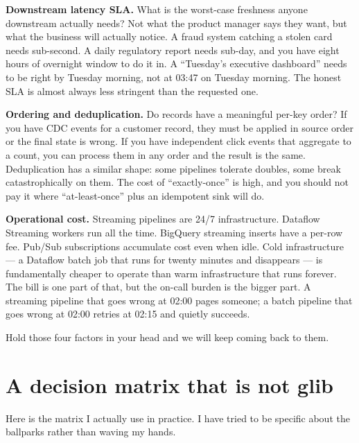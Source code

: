 \documentclass[
  11pt,
  british,
  oneside]{book}
\begin{document}
\textbf{Downstream latency SLA.} What is the worst-case freshness anyone
downstream actually needs? Not what the product manager says they want,
but what the business will actually notice. A fraud system catching a
stolen card needs sub-second. A daily regulatory report needs sub-day,
and you have eight hours of overnight window to do it in. A ``Tuesday's
executive dashboard'' needs to be right by Tuesday morning, not at 03:47
on Tuesday morning. The honest SLA is almost always less stringent than
the requested one.

\textbf{Ordering and deduplication.} Do records have a meaningful
per-key order? If you have CDC events for a customer record, they must
be applied in source order or the final state is wrong. If you have
independent click events that aggregate to a count, you can process them
in any order and the result is the same. Deduplication has a similar
shape: some pipelines tolerate doubles, some break catastrophically on
them. The cost of ``exactly-once'' is high, and you
should not pay it where ``at-least-once'' plus an idempotent sink will
do.

\textbf{Operational cost.} Streaming pipelines are 24/7 infrastructure.
Dataflow Streaming workers run all the time.
BigQuery streaming inserts have a per-row fee. Pub/Sub
subscriptions accumulate cost even when idle. Cold infrastructure --- a
Dataflow batch job that runs for twenty minutes and disappears --- is
fundamentally cheaper to operate than warm infrastructure that runs
forever. The bill is one part of that, but the on-call burden is the
bigger part. A streaming pipeline that goes wrong at 02:00 pages
someone; a batch pipeline that goes wrong at 02:00 retries at 02:15 and
quietly succeeds.

Hold those four factors in your head and we will keep coming back to
them.

\hypertarget{a-decision-matrix-that-is-not-glib}{%
\section{A decision matrix that is not
glib}\label{a-decision-matrix-that-is-not-glib}}

Here is the matrix I actually use in practice. I have tried to be
specific about the ballparks rather than waving my hands.
\end{document}
